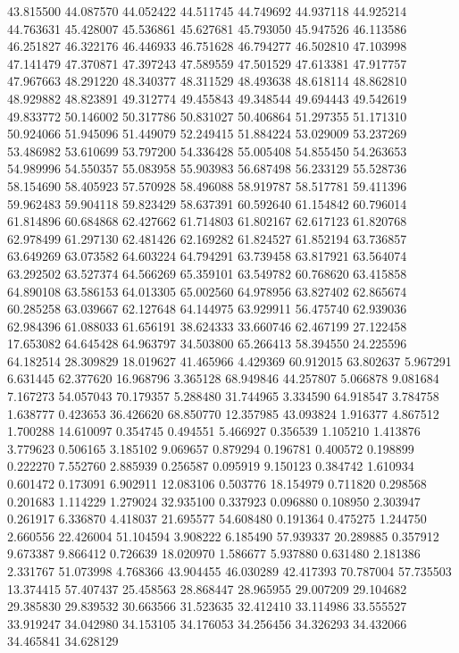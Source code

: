 43.815500
44.087570
44.052422
44.511745
44.749692
44.937118
44.925214
44.763631
45.428007
45.536861
45.627681
45.793050
45.947526
46.113586
46.251827
46.322176
46.446933
46.751628
46.794277
46.502810
47.103998
47.141479
47.370871
47.397243
47.589559
47.501529
47.613381
47.917757
47.967663
48.291220
48.340377
48.311529
48.493638
48.618114
48.862810
48.929882
48.823891
49.312774
49.455843
49.348544
49.694443
49.542619
49.833772
50.146002
50.317786
50.831027
50.406864
51.297355
51.171310
50.924066
51.945096
51.449079
52.249415
51.884224
53.029009
53.237269
53.486982
53.610699
53.797200
54.336428
55.005408
54.855450
54.263653
54.989996
54.550357
55.083958
55.903983
56.687498
56.233129
55.528736
58.154690
58.405923
57.570928
58.496088
58.919787
58.517781
59.411396
59.962483
59.904118
59.823429
58.637391
60.592640
61.154842
60.796014
61.814896
60.684868
62.427662
61.714803
61.802167
62.617123
61.820768
62.978499
61.297130
62.481426
62.169282
61.824527
61.852194
63.736857
63.649269
63.073582
64.603224
64.794291
63.739458
63.817921
63.564074
63.292502
63.527374
64.566269
65.359101
63.549782
60.768620
63.415858
64.890108
63.586153
64.013305
65.002560
64.978956
63.827402
62.865674
60.285258
63.039667
62.127648
64.144975
63.929911
56.475740
62.939036
62.984396
61.088033
61.656191
38.624333
33.660746
62.467199
27.122458
17.653082
64.645428
64.963797
34.503800
65.266413
58.394550
24.225596
64.182514
28.309829
18.019627
41.465966
4.429369
60.912015
63.802637
5.967291
6.631445
62.377620
16.968796
3.365128
68.949846
44.257807
5.066878
9.081684
7.167273
54.057043
70.179357
5.288480
31.744965
3.334590
64.918547
3.784758
1.638777
0.423653
36.426620
68.850770
12.357985
43.093824
1.916377
4.867512
1.700288
14.610097
0.354745
0.494551
5.466927
0.356539
1.105210
1.413876
3.779623
0.506165
3.185102
9.069657
0.879294
0.196781
0.400572
0.198899
0.222270
7.552760
2.885939
0.256587
0.095919
9.150123
0.384742
1.610934
0.601472
0.173091
6.902911
12.083106
0.503776
18.154979
0.711820
0.298568
0.201683
1.114229
1.279024
32.935100
0.337923
0.096880
0.108950
2.303947
0.261917
6.336870
4.418037
21.695577
54.608480
0.191364
0.475275
1.244750
2.660556
22.426004
51.104594
3.908222
6.185490
57.939337
20.289885
0.357912
9.673387
9.866412
0.726639
18.020970
1.586677
5.937880
0.631480
2.181386
2.331767
51.073998
4.768366
43.904455
46.030289
42.417393
70.787004
57.735503
13.374415
57.407437
25.458563
28.868447
28.965955
29.007209
29.104682
29.385830
29.839532
30.663566
31.523635
32.412410
33.114986
33.555527
33.919247
34.042980
34.153105
34.176053
34.256456
34.326293
34.432066
34.465841
34.628129
